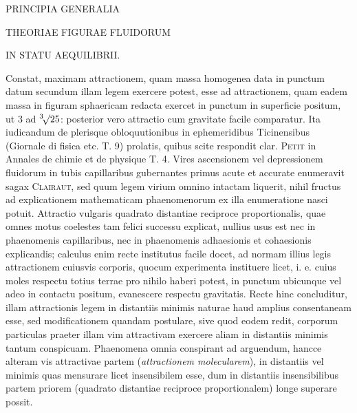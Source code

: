 \renewcommand{\Article}[1]{\par\medskip\Needspace{4\baselineskip}\pdfbookmark[1]{Art. #1}{fluidorum-art-#1}\centerline{\textbf{#1.}}\nobreak\smallskip}
\par\medskip
\centerline{PRINCIPIA GENERALIA}
\centerline{THEORIAE FIGURAE FLUIDORUM}
\centerline{IN STATU AEQUILIBRII.}
\medskip
\expandafter\def\csname HistoricalNoteText4\endcsname{Constat, maximam attractionem, quam massa homogenea data in punctum datum secundum illam legem exercere potest, esse ad attractionem, quam eadem massa in figuram sphaericam redacta exercet in punctum in superficie positum, ut $3$ ad $\BareRoot[3]{25}$: posterior vero attractio cum gravitate facile comparatur.}
\expandafter\def\csname HistoricalNoteText5\endcsname{Ita iudicandum de plerisque obloquutionibus in ephemeridibus Ticinensibus (Giornale di fisica etc. T. 9) prolatis, quibus scite respondit clar. \textsc{Petit} in Annales de chimie et de physique T. 4.}
Vires ascensionem vel depressionem fluidorum in tubis capillaribus gubernantes primus acute et accurate enumeravit sagax \textsc{Clairaut}, sed quum legem virium omnino intactam liquerit, nihil fructus ad explicationem mathematicam phaenomenorum ex illa enumeratione nasci potuit. Attractio vulgaris quadrato distantiae reciproce proportionalis, quae omnes motus coelestes tam felici successu explicat, nullius usus est nec in phaenomenis capillaribus, nec in phaenomenis adhaesionis et cohaesionis explicandis; calculus enim recte institutus facile docet, ad normam illius legis attractionem cuiusvis corporis, quocum experimenta instituere licet, i. e. cuius moles respectu totius terrae pro nihilo haberi potest, in punctum ubicunque vel adeo in contactu positum, evanescere respectu gravitatis. Recte hinc concluditur, illam attractionis legem in distantiis minimis naturae haud amplius consentaneam esse, sed modificationem quandam postulare, sive quod eodem redit, corporum particulas praeter illam vim attractivam exercere aliam in distantiis minimis tantum conspicuam. Phaenomena omnia conspirant ad arguendum, hancce alteram vis attractivae partem (\textit{attractionem molecularem}), in distantiis vel minimis quas mensurare licet insensibilem esse, dum in distantiis insensibilibus partem priorem (quadrato distantiae reciproce proportionalem) longe superare possit.

